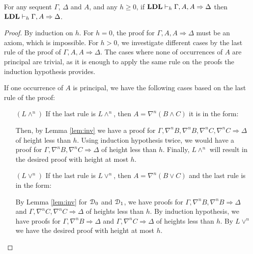 \begin{thm}\label{thm:lc-adm} For any sequent $\Gamma$, $\Delta$ and $A$, and any $h \geq 0$, if $\mathbf{LDL} \vdash_h \Gamma, A, A \Rightarrow \Delta$ then $\mathbf{LDL} \vdash_h \Gamma, A \Rightarrow \Delta$.
\end{thm}
\begin{proof}
  By induction on $h$. For $h = 0$, the proof for $\Gamma, A, A \Rightarrow \Delta$ must be an axiom, which is impossible. For $h > 0$, we investigate different cases by the last rule of the proof of $\Gamma, A, A \Rightarrow \Delta$. The cases where none of occurrences of $A$ are principal are trivial, as it is enough to apply the same rule on the proofs the induction hypothesis provides.
  
  If one occurrence of $A$ is principal, we have the following cases based on the last rule of the proof:
	\begin{itemize}
		\item[$(L \wedge ^n)$] If the last rule is $L \wedge ^n$, then $A = \nabla^n (B \wedge C)$ it is in the form:

		\begin{prooftree}
			 \noLine
		\end{prooftree}

		Then, by Lemma \ref{lem:inv} we have a proof for $\Gamma, \nabla^n B, \nabla^n B, \nabla^n C, \nabla^n C \Rightarrow \Delta$ of height less than $h$. Using induction hypothesis twice, we would have a proof for $\Gamma, \nabla^n B, \nabla^n C \Rightarrow \Delta$ of height less than $h$. Finally, $L \wedge ^n$ will result in the desired proof with height at most $h$.
	
		\item[$(L \vee ^n)$] If the last rule is $L \vee ^n$, then $A = \nabla^n (B \vee C)$ and the last rule is in the form:
		\begin{prooftree}
			 \noLine
			\UIC{$ \Gamma, \nabla^n B, \nabla^n (B \vee C) \Rightarrow \Delta$}
			 \noLine
			\UIC{$\Gamma, \nabla^n C, \nabla^n (B \vee C) \Rightarrow \Delta$}
			\RightLabel{$L \vee ^n$}
			\BIC{$ \Gamma, \nabla^n (B \vee C), \nabla^n (B \vee C) \Rightarrow \Delta$}		
		\end{prooftree}
		By Lemma \ref{lem:inv} for $\mathcal{D}_0$ and $\mathcal{D}_1$, we have proofs for $\Gamma, \nabla^n B, \nabla^n B \Rightarrow \Delta$ and $\Gamma, \nabla^n C, \nabla^n C \Rightarrow \Delta$ of heights less than $h$. By induction hypothesis, we have proofs for $\Gamma, \nabla^n B \Rightarrow \Delta$ and $\Gamma, \nabla^n C \Rightarrow \Delta$ of heights less than $h$. By $L \vee ^n$ we have the desired proof with height at most $h$.
	

\end{itemize}
\end{proof}
